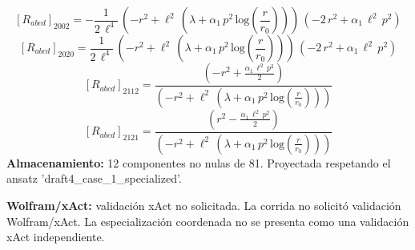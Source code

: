 \documentclass[11pt]{article}
\begin{document}
\begin{dmath*}[breakdepth={5}]
\left[R_{abcd}\right]_{2002} = -\frac{1}{2\,{\ell}^{4}}\,\left(-{r}^{2} + {\ell}^{2}\,\left(\lambda + \alpha_{1}\,{p}^{2}\,\mathrm{log}\!\left(\frac{r}{r_{0}}\right)\right)\right)\,\left(-2\,{r}^{2} + \alpha_{1}\,{\ell}^{2}\,{p}^{2}\right)
\end{dmath*}
\begin{dmath*}[breakdepth={5}]
\left[R_{abcd}\right]_{2020} = \frac{1}{2\,{\ell}^{4}}\,\left(-{r}^{2} + {\ell}^{2}\,\left(\lambda + \alpha_{1}\,{p}^{2}\,\mathrm{log}\!\left(\frac{r}{r_{0}}\right)\right)\right)\,\left(-2\,{r}^{2} + \alpha_{1}\,{\ell}^{2}\,{p}^{2}\right)
\end{dmath*}
\begin{dmath*}[breakdepth={5}]
\left[R_{abcd}\right]_{2112} = \frac{\left(-{r}^{2} + \frac{\alpha_{1}\,{\ell}^{2}\,{p}^{2}}{2}\right)}{\left(-{r}^{2} + {\ell}^{2}\,\left(\lambda + \alpha_{1}\,{p}^{2}\,\mathrm{log}\!\left(\frac{r}{r_{0}}\right)\right)\right)}
\end{dmath*}
\begin{dmath*}[breakdepth={5}]
\left[R_{abcd}\right]_{2121} = \frac{\left({r}^{2} - \frac{\alpha_{1}\,{\ell}^{2}\,{p}^{2}}{2}\right)}{\left(-{r}^{2} + {\ell}^{2}\,\left(\lambda + \alpha_{1}\,{p}^{2}\,\mathrm{log}\!\left(\frac{r}{r_{0}}\right)\right)\right)}
\end{dmath*}
\textbf{Almacenamiento:} 12 componentes no nulas de 81. Proyectada respetando el ansatz 'draft4\_case\_1\_specialized'.\par
\textbf{Wolfram/xAct:} validación xAct no solicitada. La corrida no solicitó validación Wolfram/xAct. La especialización coordenada no se presenta como una validación xAct independiente.\par\medskip
{}
\end{document}

